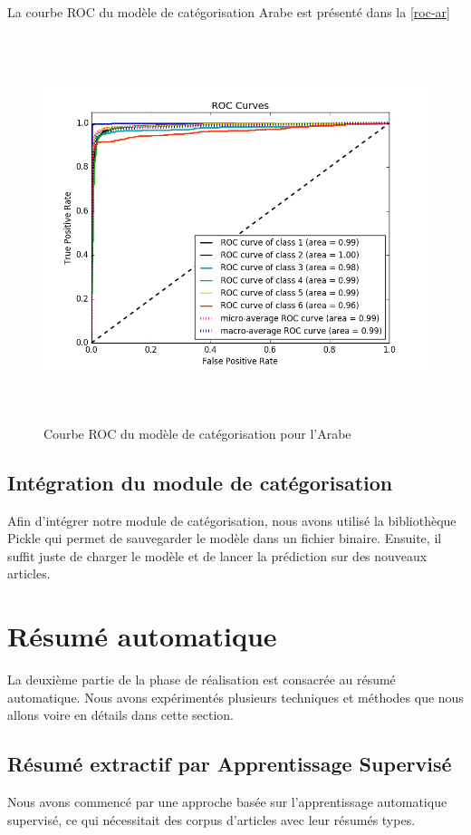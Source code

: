     La courbe ROC du modèle de catégorisation Arabe est présenté dans la \autoref{roc-ar} 
    \begin{figure}[H]
        \centering
        \includegraphics[height=320pt,width=330pt]{img/chapter4/result/rocAR.png}
        \caption{Courbe ROC du modèle de catégorisation pour l'Arabe}
        \label{roc-ar}
    \end{figure}
    
\subsection{Intégration du module de catégorisation}
Afin d'intégrer notre module de catégorisation, nous avons utilisé la bibliothèque Pickle qui permet de sauvegarder le modèle dans un fichier binaire. Ensuite, il suffit juste de charger le modèle et de lancer la prédiction sur des nouveaux articles.


\section{Résumé automatique}
La deuxième partie de la phase de réalisation est consacrée au résumé automatique. Nous avons expérimentés plusieurs techniques et méthodes que nous allons voire en détails dans cette section. 
\subsection{Résumé extractif par Apprentissage Supervisé}
Nous avons commencé par une approche basée sur l'apprentissage automatique supervisé, ce qui nécessitait des corpus d'articles avec leur résumés types.

